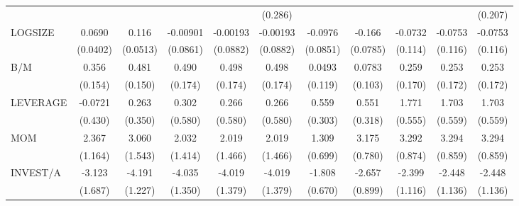 \begin{table}[htbp]
\begin{tabular}{l*{10}{c}}
                &                  &                  &                  &                  &  (0.286)         &                  &                  &                  &                  &  (0.207)         \\
LOGSIZE         &   0.0690\sym{*}  &    0.116\sym{**} & -0.00901         & -0.00193         & -0.00193         &  -0.0976         &   -0.166\sym{**} &  -0.0732         &  -0.0753         &  -0.0753         \\
                & (0.0402)         & (0.0513)         & (0.0861)         & (0.0882)         & (0.0882)         & (0.0851)         & (0.0785)         &  (0.114)         &  (0.116)         &  (0.116)         \\
B/M             &    0.356\sym{**} &    0.481\sym{***}&    0.490\sym{***}&    0.498\sym{***}&    0.498\sym{***}&   0.0493         &   0.0783         &    0.259         &    0.253         &    0.253         \\
                &  (0.154)         &  (0.150)         &  (0.174)         &  (0.174)         &  (0.174)         &  (0.119)         &  (0.103)         &  (0.170)         &  (0.172)         &  (0.172)         \\
LEVERAGE        &  -0.0721         &    0.263         &    0.302         &    0.266         &    0.266         &    0.559\sym{*}  &    0.551\sym{*}  &    1.771\sym{***}&    1.703\sym{***}&    1.703\sym{***}\\
                &  (0.430)         &  (0.350)         &  (0.580)         &  (0.580)         &  (0.580)         &  (0.303)         &  (0.318)         &  (0.555)         &  (0.559)         &  (0.559)         \\
MOM             &    2.367\sym{**} &    3.060\sym{*}  &    2.032         &    2.019         &    2.019         &    1.309\sym{*}  &    3.175\sym{***}&    3.292\sym{***}&    3.294\sym{***}&    3.294\sym{***}\\
                &  (1.164)         &  (1.543)         &  (1.414)         &  (1.466)         &  (1.466)         &  (0.699)         &  (0.780)         &  (0.874)         &  (0.859)         &  (0.859)         \\
INVEST/A        &   -3.123\sym{*}  &   -4.191\sym{***}&   -4.035\sym{***}&   -4.019\sym{***}&   -4.019\sym{***}&   -1.808\sym{***}&   -2.657\sym{***}&   -2.399\sym{**} &   -2.448\sym{**} &   -2.448\sym{**} \\
                &  (1.687)         &  (1.227)         &  (1.350)         &  (1.379)         &  (1.379)         &  (0.670)         &  (0.899)         &  (1.116)         &  (1.136)         &  (1.136)         \\

\end{tabular}
\end{table}
